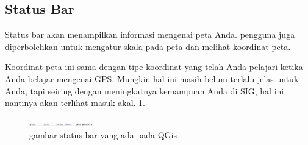 \subsection{Status Bar}
Status bar akan menampilkan informasi mengenai peta Anda. pengguna juga diperbolehkan untuk mengatur skala pada peta dan melihat koordinat peta.

Koordinat peta ini sama dengan tipe koordinat yang telah Anda pelajari ketika Anda belajar mengenai GPS.
Mungkin hal ini masih belum terlalu jelas untuk Anda, tapi seiring dengan meningkatnya kemampuan Anda di SIG, hal ini nantinya akan terlihat masuk akal. \ref{qgis:statbar}.
\begin{figure}[ht]
    \centerline{\includegraphics[width=0.25\textwidth]{figures/statbar}}
    \caption{gambar status bar yang ada pada QGis}
    \label{qgis:statbar}
    \end{figure}

